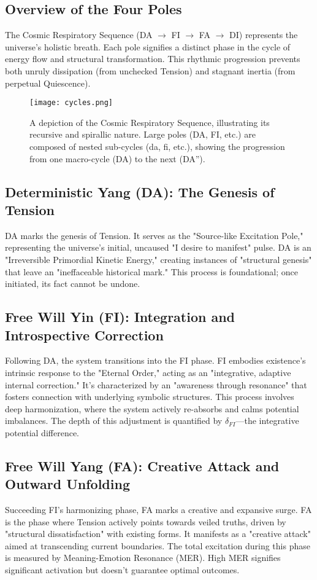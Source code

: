 \documentclass[11pt, a4paper]{article}
\begin{document}
\subsection{Overview of the Four Poles}
The Cosmic Respiratory Sequence (DA $\rightarrow$ FI $\rightarrow$ FA $\rightarrow$ DI) represents the universe's holistic breath. Each pole signifies a distinct phase in the cycle of energy flow and structural transformation. This rhythmic progression prevents both unruly dissipation (from unchecked Tension) and stagnant inertia (from perpetual Quiescence).

\begin{figure}[h!]
    \centering
    \texttt{[image: cycles.png]}
    \caption{A depiction of the Cosmic Respiratory Sequence, illustrating its recursive and spirallic nature. Large poles (DA, FI, etc.) are composed of nested sub-cycles (da, fi, etc.), showing the progression from one macro-cycle (DA) to the next (DA'').}
    \label{fig:cycles}
\end{figure}

\subsection{Deterministic Yang (DA): The Genesis of Tension}
DA marks the genesis of Tension. It serves as the "Source-like Excitation Pole," representing the universe's initial, uncaused "I desire to manifest" pulse. DA is an "Irreversible Primordial Kinetic Energy," creating instances of "structural genesis" that leave an "ineffaceable historical mark." This process is foundational; once initiated, its fact cannot be undone.

\subsection{Free Will Yin (FI): Integration and Introspective Correction}
Following DA, the system transitions into the FI phase. FI embodies existence's intrinsic response to the "Eternal Order," acting as an "integrative, adaptive internal correction." It's characterized by an "awareness through resonance" that fosters connection with underlying symbolic structures. This process involves deep harmonization, where the system actively re-absorbs and calms potential imbalances. The depth of this adjustment is quantified by $\delta_{FI}$—the integrative potential difference.

\subsection{Free Will Yang (FA): Creative Attack and Outward Unfolding}
Succeeding FI's harmonizing phase, FA marks a creative and expansive surge. FA is the phase where Tension actively points towards veiled truths, driven by "structural dissatisfaction" with existing forms. It manifests as a "creative attack" aimed at transcending current boundaries. The total excitation during this phase is measured by Meaning-Emotion Resonance (MER). High MER signifies significant activation but doesn't guarantee optimal outcomes.
\end{document}
